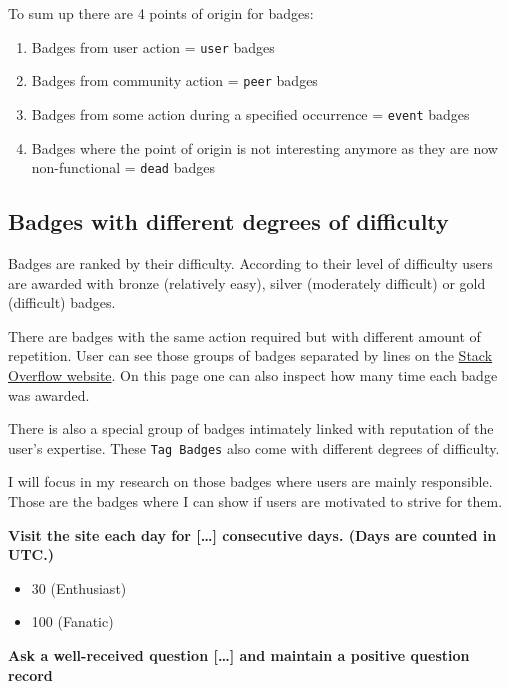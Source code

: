 \documentclass[]{book}
\providecommand{\tightlist}{%
  \setlength{\itemsep}{0pt}\setlength{\parskip}{0pt}}
\theoremstyle{definition}
\theoremstyle{definition}
\theoremstyle{definition}
\theoremstyle{remark}
\begin{document}
To sum up there are 4 points of origin for badges:

\begin{enumerate}
\def\labelenumi{\arabic{enumi})}
\tightlist
\item
  Badges from user action = \texttt{user} badges
\item
  Badges from community action = \texttt{peer} badges
\item
  Badges from some action during a specified occurrence = \texttt{event}
  badges
\item
  Badges where the point of origin is not interesting anymore as they
  are now non-functional = \texttt{dead} badges
\end{enumerate}

\subsection{Badges with different degrees of
difficulty}\label{badges-with-different-degrees-of-difficulty}

Badges are ranked by their difficulty. According to their level of
difficulty users are awarded with bronze (relatively easy), silver
(moderately difficult) or gold (difficult) badges.

There are badges with the same action required but with different amount
of repetition. User can see those groups of badges separated by lines on
the \href{https://stackoverflow.com/help/badges}{Stack Overflow
website}. On this page one can also inspect how many time each badge was
awarded.

There is also a special group of badges intimately linked with
reputation of the user's expertise. These \texttt{Tag\ Badges} also come
with different degrees of difficulty.

I will focus in my research on those badges where users are mainly
responsible. Those are the badges where I can show if users are
motivated to strive for them.

\textbf{Visit the site each day for {[}\ldots{}{]} consecutive days.
(Days are counted in UTC.)}

\begin{itemize}
\tightlist
\item
  30 (Enthusiast)
\item
  100 (Fanatic)
\end{itemize}

\textbf{Ask a well-received question {[}\ldots{}{]} and maintain a
positive question record}
\end{document}
